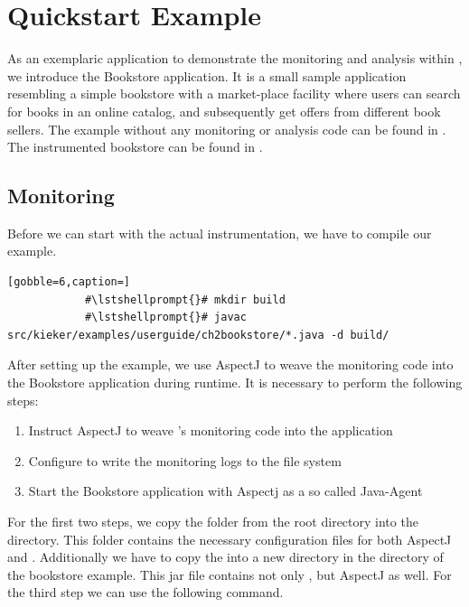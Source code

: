 \chapter{Quickstart Example}\label{chp:Quickstart-Example}

	As an exemplaric application to demonstrate the monitoring and analysis within \Kieker{}, we introduce the Bookstore application. It is a small sample application resembling a simple bookstore with a market-place facility where users can search for books in an online catalog, and subsequently get offers from different book sellers. The example without any monitoring or analysis code can be found in \dir{\plainBookstoreApplicationDirDistro}. The instrumented bookstore can be found in \dir{\quickstartBookstoreApplicationDirDistro}.

	\section{Monitoring}
	
		Before we can start with the actual instrumentation, we have to compile our example.
		\setBashListing
		\begin{lstlisting}[gobble=6,caption=]
			#\lstshellprompt{}# mkdir build
			#\lstshellprompt{}# javac src/kieker/examples/userguide/ch2bookstore/*.java -d build/
		\end{lstlisting} 

		\noindent
		After setting up the example, we use AspectJ \cite{AspectJ-WebSite} to weave the \Kieker{} monitoring code into the Bookstore application during runtime. It is necessary to perform the following steps:
		\begin{enumerate}
			\setlength{\itemsep}{-2pt}
			\item Instruct AspectJ to weave \Kieker{}'s monitoring code into the application
			\item Configure \Kieker{} to write the monitoring logs to the file system
			\item Start the Bookstore application with Aspectj as a so called Java-Agent 
		\end{enumerate}
	
		\noindent
		For the first two steps, we copy the  folder from the root directory into the  directory. This folder contains the necessary configuration files for both AspectJ and \Kieker{}. Additionally we have to copy the  into a new  directory in the directory of the bookstore example. This jar file contains not only \Kieker{}, but AspectJ as well. For the third step we can use the following command.
		

